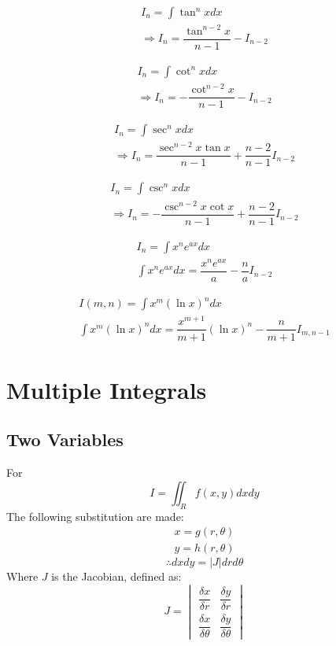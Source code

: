 \documentclass[openany, oneside]{book}
\begin{document}
\begin{align}
I_n=\int \tan^n x dx\nonumber\\
\Rightarrow I_n=\dfrac{\tan^{n-2} x}{n-1}-I_{n-2}
\end{align}

\begin{align}
I_n=\int \cot^n x dx\nonumber\\
\Rightarrow I_n=-\dfrac{\cot^{n-2} x}{n-1}-I_{n-2}
\end{align}

\begin{align}
I_n=\int \sec^n x dx\nonumber\\
\Rightarrow I_n=\dfrac{\sec^{n-2}x\tan x}{n-1}+\dfrac{n-2}{n-1}I_{n-2}
\end{align}

\begin{align}
I_n=\int \csc^n x dx\nonumber\\
\Rightarrow I_n=-\dfrac{\csc^{n-2}x\cot x}{n-1}+\dfrac{n-2}{n-1}I_{n-2}
\end{align}

\begin{align}
I_n=\int x^n e^{ax} dx\\
\int x^n e^{ax} dx=\dfrac{x^n e^{ax}}{a}-\dfrac{n}{a}I_{n-2}
\end{align}

\begin{align}
I(m,n)=\int x^m (\ln x)^n dx\\
\int x^m (\ln x)^n dx=\dfrac{x^{m+1}}{m+1}(\ln x)^n-\dfrac{n}{m+1}I_{m,n-1}
\end{align}

\large{\chapter{Multiple Integrals}}
\section{Two Variables}
For
\begin{equation}
I=\iint_R f(x,y) dxdy
\end{equation}
The following substitution are made:
\begin{align}
x=g(r,\theta)\\
y=h(r,\theta)
\end{align}
\begin{equation}
\therefore dx dy=\lvert J \rvert dr d\theta
\end{equation}
Where $J$ is the Jacobian, defined as:
\begin{equation}
J=\begin{vmatrix}
\dfrac{\delta x}{\delta r}&\dfrac{\delta y}{\delta r}\\
\dfrac{\delta x}{\delta \theta}&\dfrac{\delta y}{\delta \theta}
\end{vmatrix}
\end{equation}
\end{document}
